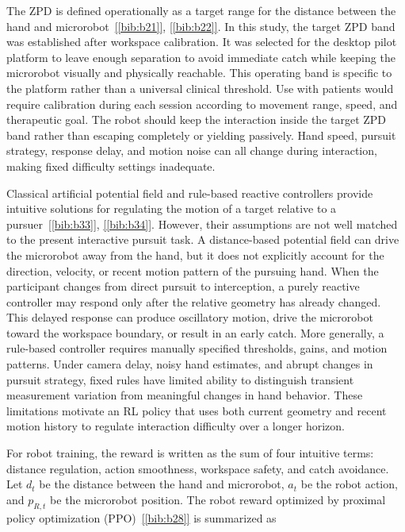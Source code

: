 \documentclass[journal,twoside,web]{ieeecolor2}
\newcommand{\citelink}[1]{\hyperref[bib:#1]{[\ref*{bib:#1}]}}
\begin{document}
The ZPD is defined operationally as a target range for the distance between the hand and microrobot~\citelink{b21}, \citelink{b22}. In this study, the target ZPD band was established after workspace calibration. It was selected for the desktop pilot platform to leave enough separation to avoid immediate catch while keeping the microrobot visually and physically reachable. This operating band is specific to the platform rather than a universal clinical threshold. Use with patients would require calibration during each session according to movement range, speed, and therapeutic goal. The robot should keep the interaction inside the target ZPD band rather than escaping completely or yielding passively. Hand speed, pursuit strategy, response delay, and motion noise can all change during interaction, making fixed difficulty settings inadequate.

Classical artificial potential field and rule-based reactive controllers provide intuitive solutions for regulating the motion of a target relative to a pursuer~\citelink{b33}, \citelink{b34}. However, their assumptions are not well matched to the present interactive pursuit task. A distance-based potential field can drive the microrobot away from the hand, but it does not explicitly account for the direction, velocity, or recent motion pattern of the pursuing hand. When the participant changes from direct pursuit to interception, a purely reactive controller may respond only after the relative geometry has already changed. This delayed response can produce oscillatory motion, drive the microrobot toward the workspace boundary, or result in an early catch. More generally, a rule-based controller requires manually specified thresholds, gains, and motion patterns. Under camera delay, noisy hand estimates, and abrupt changes in pursuit strategy, fixed rules have limited ability to distinguish transient measurement variation from meaningful changes in hand behavior. These limitations motivate an RL policy that uses both current geometry and recent motion history to regulate interaction difficulty over a longer horizon.

For robot training, the reward is written as the sum of four intuitive terms: distance regulation, action smoothness, workspace safety, and catch avoidance. Let $d_t$ be the distance between the hand and microrobot, $a_t$ be the robot action, and $p_{R,t}$ be the microrobot position. The robot reward optimized by proximal policy optimization (PPO)~\citelink{b28} is summarized as
\end{document}

